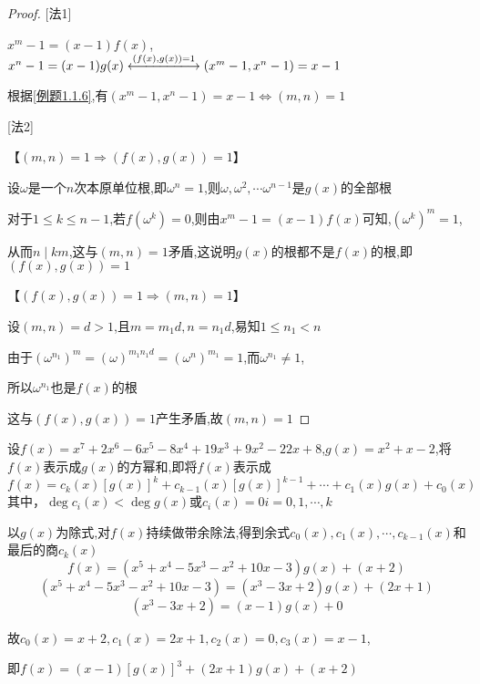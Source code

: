 \begin{proof}

    [法1]

    $x^m-1=(x-1)f(x)$,$x^n-1=(x-1)g(x)\xlongleftrightarrow{(f(x),g(x))=1} (x^m-1,x^n-1)=x-1$

    根据\cref{例题1.1.6},有$(x^m-1,x^n-1)=x-1\Longleftrightarrow (m,n)=1$

    [法2]

    【$ (m,n)=1 \Longrightarrow (f(x),g(x))=1$】

    设$\omega$是一个$n$次本原单位根,即$\omega^n=1$,则$\omega,\omega^2,\cdots \omega^{n-1}$是$g(x)$的全部根

    对于$1\le k\le n-1$,若$f(\omega^k)=0$,则由$x^m-1=(x-1)f(x)$可知,$(\omega^k)^m=1$,

    从而$n\mid km$,这与$(m,n)=1$矛盾,这说明$g(x)$的根都不是$f(x)$的根,即$(f(x),g(x))=1$

    【$ (f(x),g(x))=1 \Longrightarrow  (m,n)=1$】

    设$(m,n)=d>1$,且$m=m_1d,n=n_1d$,易知$1\le n_1<n$

    由于$(\omega^{n_1})^m=(\omega)^{m_1n_1d}=(\omega^n)^{m_1}=1$,而$\omega^{n_1}\ne 1$,

    所以$\omega^{n_1}$也是$f(x)$的根

    这与$(f(x),g(x))=1$产生矛盾,故$(m,n)=1$
\end{proof}

\clearpage
\begin{example}
    设$f(x)=x^7+2x^6-6x^5-8x^4+19x^3+9x^2-22x+8$,$g(x)=x^2+x-2$,将$f(x)$表示成$g(x)$的方幂和,即将$f(x)$表示成
    \begin{equation*}
        f(x)=c_k(x)[g(x)]^k + c_{k-1}(x)[g(x)]^{k-1}+ \cdots +c_1(x)g(x)+c_0(x)
    \end{equation*}
    其中，$\deg c_i(x)<\deg g(x)$或$c_i(x)=0$\quad $i=0,1,\cdots,k$
\end{example}

\begin{solution}
    
    以$g(x)$为除式,对$f(x)$持续做带余除法,得到余式$c_0(x),c_1(x),\cdots,c_{k-1}(x)$和最后的商$c_k(x)$
    \begin{equation*}
        f(x)=(x^5+x^4-5x^3-x^2+10x-3)g(x)+(x+2)
    \end{equation*}
    \begin{equation*}
        (x^5+x^4-5x^3-x^2+10x-3)=(x^3-3x+2)g(x)+(2x+1)
    \end{equation*}
    \begin{equation*}
        (x^3-3x+2)=(x-1)g(x)+0
    \end{equation*}

    故$c_0(x)=x+2,c_1(x)=2x+1,c_2(x)=0,c_3(x)=x-1$,

    即$f(x)=(x-1)[g(x)]^3+(2x+1)g(x)+(x+2)$
\end{solution}

